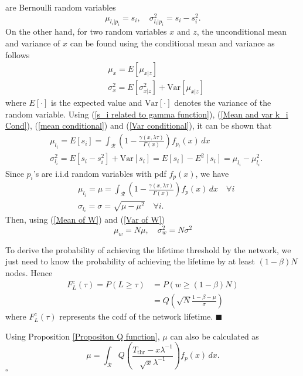 \documentclass[conference]{IEEEtran}
\begin{document}
are Bernoulli random variables
\begin{equation}\label{Mean and var k_i Cond}
\mu_{l_i \vert p_i}= s_i, \quad \sigma_{l_i \vert p_i}^2 = s_i -
s_i^2.
\end{equation}
On the other hand, for two random variables $x$ and $z$, the
unconditional mean and variance of $x$ can be found using the
conditional mean and variance as follows \cite{Ross_Prob}
\begin{align}
&\mu_x = E[\mu_{x \vert z}] \label{mean conditional} \\
&\sigma^2_x = E[\sigma^2_{x \vert z}] + \text{Var}[\mu_{x \vert z}]
\label{Var conditional}
\end{align}
where $E[\cdot]$ is the expected value and $\text{Var}[\cdot]$
denotes the variance of the random variable. Using (\ref{s_i related
to gamma function}), (\ref{Mean and var k_i Cond}), (\ref{mean
conditional}) and (\ref{Var conditional}), it can be shown that
\begin{align}
&\mu_{l_i} = E[s_i] = \int_{\mathcal{R}} \left (1 - \frac{\gamma
(x,\lambda
\tau)}{\Gamma(x)}\right) f_{p_i}(x)\,dx\\
&\sigma^2_{l_i} = E[s_i - s_i^2] + \text{Var}[s_i] = E[s_i] -
E^2[s_i] = \mu_{l_i} - \mu^2_{l_i}.
\end{align}
Since $p_i$'s are i.i.d random variables with pdf $f_p(x)$, we have
\begin{align}
&\mu_{l_i} = \mu = \int_{\mathcal{R}} \left (1 - \frac{\gamma
(x,\lambda \tau)}{\Gamma(x)}\right) f_{p}(x)\,dx   \quad \forall i \\
&\sigma_{l_i} = \sigma = \sqrt{\mu - \mu^2} \quad \forall i.
\end{align}
Then, using (\ref{Mean of W}) and (\ref{Var of W})
\begin{equation}\label{mu and var w }
\mu_w = N\mu, \quad \sigma^2_w = N\sigma^2
\end{equation}

To derive the probability of achieving the lifetime threshold by the
network, we just need to know the probability of achieving the
lifetime by at least $(1 - \beta)N$ nodes. Hence
\begin{align}
F_L^c(\tau) = P(L\geq \tau) & = P(w \geq (1-\beta)N)\nonumber\\
&= Q\left(\sqrt{N}\frac{1- \beta - \mu}{\sigma} \right)
\end{align}
where $F_L^c(\tau)$ represents the ccdf of the network lifetime.
\hfill $\blacksquare$

\prop \label{Proposition mu Q function} Using Proposition
\ref{Propositon Q function}, $\mu$ can also be calculated as
\begin{equation}
\mu = \int_{\mathcal{R}} Q\left(\frac{T_{\mathrm{thr}} -
x\lambda^{-1}}{\sqrt{x}\lambda ^{-1}}\right) f_{p}(x)\,dx.
\end{equation}\hfill $ \square$
\end{document}

